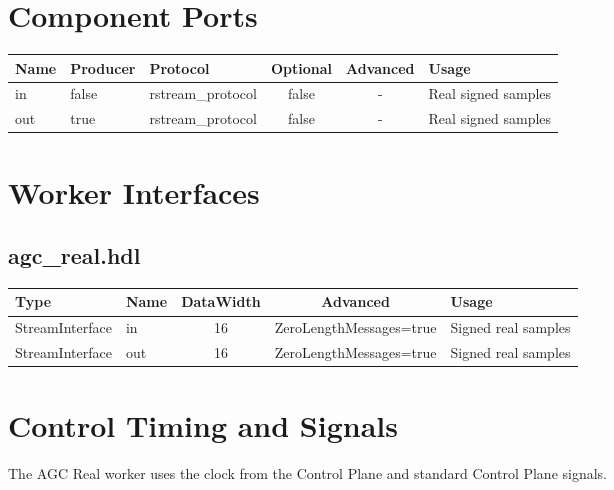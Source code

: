 \documentclass{article}
\def\comp{agc\_real}
\def\Comp{AGC Real}
\begin{document}
\begin{landscape}
\section*{Component Ports}
\begin{scriptsize}
	\begin{tabular}{|M{2cm}|M{1.5cm}|M{4cm}|c|c|M{9cm}|}
		\hline
		Name & Producer & Protocol          & Optional & Advanced & Usage               \\
		\hline
		in   & false    & rstream\_protocol & false    & -        & Real signed samples \\
		\hline
		out  & true     & rstream\_protocol & false    & -        & Real signed samples \\
		\hline
	\end{tabular}
\end{scriptsize}

\section*{Worker Interfaces}
\subsection*{\comp.hdl}
\begin{scriptsize}
	\begin{tabular}{|M{2cm}|M{1.5cm}|c|c|M{12cm}|}
		\hline
		Type            & Name & DataWidth & Advanced                & Usage               \\
		\hline
		StreamInterface & in   & 16        & ZeroLengthMessages=true & Signed real samples \\
		\hline
		StreamInterface & out  & 16        & ZeroLengthMessages=true & Signed real samples \\
		\hline
	\end{tabular}
\end{scriptsize}
\end{landscape}

\section*{Control Timing and Signals}
\begin{flushleft}
	The {\Comp} worker uses the clock from the Control Plane and standard Control Plane signals.
\end{flushleft}
\end{document}
